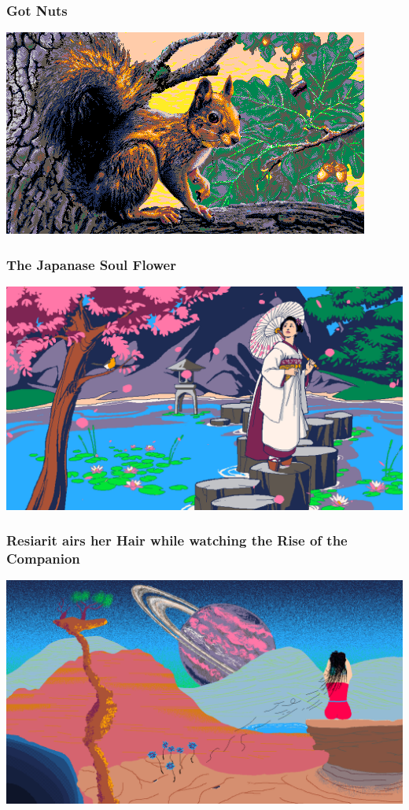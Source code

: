 \documentclass{beamer}
\begin{document}
\begin{frame}
  \frametitle{Got Nuts}
  \includegraphics[width=\textwidth]{got_nuts}
\end{frame}

\begin{frame}
  \frametitle{The Japanase Soul Flower}
  \href{https://demozoo.org/graphics/191961/}{\includegraphics[width=.9\textwidth]{TheJapaneseSoulFlower_Final}}
\end{frame}

\begin{frame}
  \frametitle{Resiarit airs her Hair while watching the Rise of the Companion}
  \href{https://files.scene.org/view/parties/2018/evoke18/pixel_graphics/animation.resiarit.gif}{\includegraphics[width=.9\textwidth]{resiarit_airs_her_hair_while_watching_the_rise_of_the_companion.png}}
\end{frame}
\end{document}
